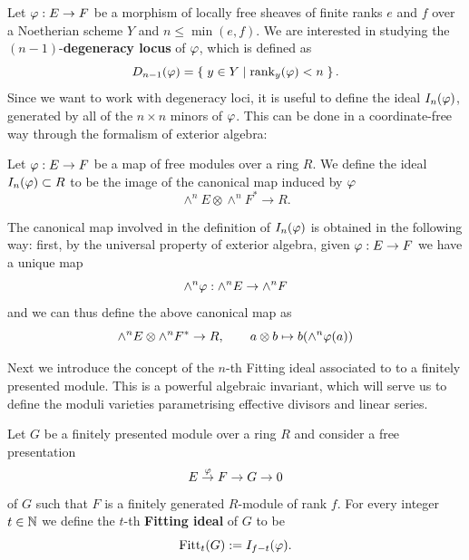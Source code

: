 	Let $\varphi:E\to F$ be a morphism of locally free sheaves of finite ranks $e$ and $f$ over a Noetherian scheme $Y$ and $n \leq \min(e,f)$. We are interested in studying the $(n-1)$-\textbf{degeneracy locus} of $\varphi$, which is defined as
	$$ D_{n-1} (\varphi) = \left\{\;  y\in Y \mid \operatorname{rank}_y(\varphi) < n  \; \right\}. $$
	Since we want to work with degeneracy loci, it is useful to define the ideal $I_n(\varphi)$, generated by all of the $n\times n$ minors of $\varphi$. This can be done in a coordinate-free way through the formalism of exterior algebra:
	\begin{defi}
	Let $\varphi:E\to F$ be a map of free modules over a ring $R$. We define the ideal $I_n(\varphi) \subset R$ to be the image of the canonical map induced by $\varphi$ 
	$$ \wedge^n E \otimes\wedge^n F^*\to R. $$
	\end{defi}
	\begin{rema}
		The canonical map involved in the definition of $I_n(\varphi)$ is obtained in the following way: first, by the universal property of exterior algebra, given $\nobreak{\varphi:E\to F}$ we have a unique map
		$$ \wedge^n\varphi : \wedge^n E \to \wedge^n F $$
		and we can thus define the above canonical map as
		$$ \wedge^n E \otimes\wedge^n F^*\to R, \qquad a\otimes b \mapsto b(\wedge^n\varphi(a)) $$
	\end{rema}

	Next we introduce the concept of the $n$-th Fitting ideal associated to to a finitely presented module. This is a powerful algebraic invariant, which will serve us to define the moduli varieties \moduu parametrising effective divisors and linear series.

	\begin{defi}
		Let $G$ be a finitely presented module over a ring $R$ and consider a free presentation 
		$$ E \overset{\varphi}\to F \to G \to 0 $$ of $G$ such that $F$ is a finitely generated $R$-module of rank $f$. For every integer
		$t \in \mathbb{N}$ we define the $t$-th \textbf{Fitting ideal} of $G$ to be 
		$$ \operatorname{Fitt}_t(G) := I_{f-t}(\varphi). $$
	\end{defi}

